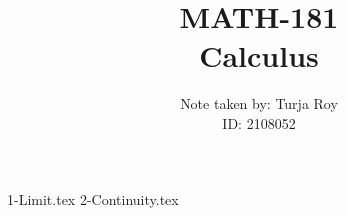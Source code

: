 \documentclass[12pt]{article}
\title{
    \textbf{MATH-181} \\
    \textbf{Calculus}
}
\author{
    Note taken by: Turja Roy \\
    ID: 2108052
}
\date{}
\begin{document}
\maketitle


\tableofcontents
\newpage


{1-Limit.tex}
\pagebreak
{2-Continuity.tex}
\pagebreak
\end{document}

